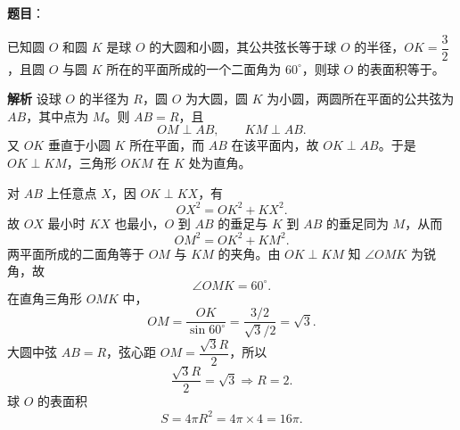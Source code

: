 \begin{answer}

\textbf{题目}：

已知圆 $O$ 和圆 $K$ 是球 $O$ 的大圆和小圆，其公共弦长等于球 $O$ 的半径，$OK=\dfrac32$，且圆 $O$ 与圆 $K$ 所在的平面所成的一个二面角为 $60^\circ$，则球 $O$ 的表面积等于\gkblank{}。

\textbf{解析}
设球 $O$ 的半径为 $R$，圆 $O$ 为大圆，圆 $K$ 为小圆，两圆所在平面的公共弦为 $AB$，其中点为 $M$。则 $AB=R$，且
\nopagebreak[4]
\[OM\perp AB,\qquad KM\perp AB.\]
又 $OK$ 垂直于小圆 $K$ 所在平面，而 $AB$ 在该平面内，故 $OK\perp AB$。于是 $OK\perp KM$，三角形 $OKM$ 在 $K$ 处为直角。

对 $AB$ 上任意点 $X$，因 $OK\perp KX$，有
\nopagebreak[4]
\[OX^2=OK^2+KX^2.\]
故 $OX$ 最小时 $KX$ 也最小，$O$ 到 $AB$ 的垂足与 $K$ 到 $AB$ 的垂足同为 $M$，从而
\nopagebreak[4]
\[OM^2=OK^2+KM^2.\]
两平面所成的二面角等于 $OM$ 与 $KM$ 的夹角。由 $OK\perp KM$ 知 $\angle OMK$ 为锐角，故
\nopagebreak[4]
\[\angle OMK=60^\circ.\]
在直角三角形 $OMK$ 中，
\nopagebreak[4]
\[OM=\frac{OK}{\sin60^\circ}
=\frac{3/2}{\sqrt3/2}=\sqrt3.\]
大圆中弦 $AB=R$，弦心距 $OM=\dfrac{\sqrt3R}{2}$，所以
\nopagebreak[4]
\[\frac{\sqrt3R}{2}=\sqrt3\Longrightarrow R=2.\]
球 $O$ 的表面积
\nopagebreak[4]
\[S=4\pi R^2=4\pi\times4=16\pi.\]


\end{answer}
